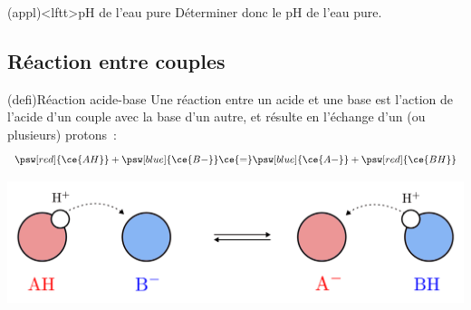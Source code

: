 \documentclass[../../main/main.tex]{subfiles}
\begin{document}
\begin{tcb*}[breakable](appl)<lftt>{pH de l'eau pure}
	Déterminer donc le pH de l'eau pure.
	\tcblower
\end{tcb*}

\subsection{Réaction entre couples}
\begin{tcb*}[sidebyside, righthand ratio=.4](defi){Réaction acide-base}
	Une réaction entre un acide  et une base  est l'action de
	l'acide d'un couple avec la base d'un autre, et résulte en l'échange d'un (ou
	plusieurs) protons~:
	\[
		\psw[red]{\ce{AH}} + \psw[blue]{\ce{B-}} \ce{=}
		\psw[blue]{\ce{A-}} + \psw[red]{\ce{BH}}
	\]
	\tcblower
	\begin{center}
		\includegraphics[width=\linewidth]{ab_echH}
	\end{center}
\end{tcb*}
\end{document}
